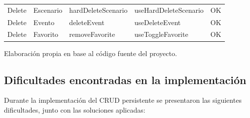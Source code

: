 \begin{table}[H]
{\begin{tablaAPA}
\begin{tabular}{@{}p{1.2cm}p{2.0cm}p{4.6cm}p{5.2cm}p{1.8cm}@{}}
        \addlinespace
        Delete & Escenario & {\footnotesize\ttfamily hardDeleteScenario} &
        {\footnotesize\ttfamily useHardDeleteScenario} & OK \\
        \addlinespace
        Delete & Evento & {\footnotesize\ttfamily deleteEvent} &
        {\footnotesize\ttfamily useDeleteEvent} & OK \\
        \addlinespace
        Delete & Favorito & {\footnotesize\ttfamily removeFavorite} &
        {\footnotesize\ttfamily useToggleFavorite} & OK \\
        \bottomrule
      \end{tabular}
    \end{tablaAPA}%
  }{Elaboraci\'on propia en base al c\'odigo fuente del proyecto.}
\end{table}

\subsection{Dificultades encontradas en la implementaci\'on}

Durante la implementaci\'on del CRUD persistente se presentaron las
siguientes dificultades, junto con las soluciones aplicadas:

